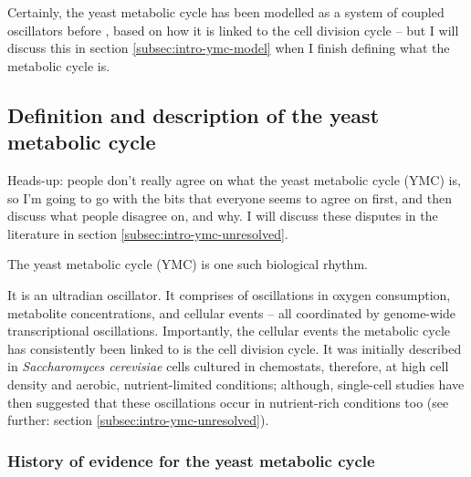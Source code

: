 Certainly, the yeast metabolic cycle has been modelled as a system of coupled oscillators before \citep{papagiannakisAutonomousMetabolicOscillations2017,ozsezenInferenceHighLevelInteraction2019}, based on how it is linked to the cell division cycle -- but I will discuss this in section \ref{subsec:intro-ymc-model} when I finish defining what the metabolic cycle is.

\subsection{Definition and description of the yeast metabolic cycle}
\label{subsec:intro-ymc-definition}

Heads-up: people don't really agree on what the yeast metabolic cycle (YMC) is, so I'm going to go with the bits that everyone seems to agree on first, and then discuss what people disagree on, and why.
I will discuss these disputes in the literature in section \ref{subsec:intro-ymc-unresolved}.

The yeast metabolic cycle (YMC) is one such biological rhythm.

It is an ultradian oscillator.
It comprises of oscillations in oxygen consumption, metabolite concentrations, and cellular events -- all coordinated by genome-wide transcriptional oscillations.
Importantly, the cellular events the metabolic cycle has consistently been linked to is the cell division cycle.
It was initially described in \emph{Saccharomyces cerevisiae} cells cultured in chemostats, therefore, at high cell density and aerobic,
nutrient-limited conditions;
although, single-cell studies have then suggested that these oscillations occur in nutrient-rich conditions too (see further: section \ref{subsec:intro-ymc-unresolved}).

\subsubsection{History of evidence for the yeast metabolic cycle}
\label{subsubsec:intro-ymc-definition-history}

